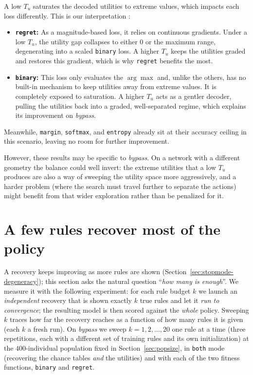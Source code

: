 A low $T_u$ saturates the decoded utilities to extreme values, which impacts each loss differently. This is our interpretation :

\begin{itemize}
    \item \textbf{\texttt{regret}:} As a magnitude-based loss, it relies on continuous gradients. Under a low $T_u$, the utility gap collapses to either $0$ or the maximum range, degenerating into a scaled \texttt{binary} loss. A higher $T_u$ keeps the utilities graded and restores this gradient, which is why \texttt{regret} benefits the most.
    \item \textbf{\texttt{binary}:} This loss only evaluates the $\arg\max$ and, unlike the others, has no built-in mechanism to keep utilities away from extreme values. It is completely exposed to saturation. A higher $T_u$ acts as a gentler decoder, pulling the utilities back into a graded, well-separated regime, which explains its improvement on \emph{bypass}.
\end{itemize}

Meanwhile, \texttt{margin}, \texttt{softmax}, and \texttt{entropy} already sit at their accuracy ceiling in this scenario, leaving no room for further improvement.

However, these results may be specific to \emph{bypass}. On a network with a different geometry the balance could well invert: the extreme utilities that a low $T_u$ produces are
also a way of sweeping the utility space more aggressively, and a harder problem
(where the search must travel further to separate the actions) might benefit
from that wider exploration rather than be penalized for it.
\newpage
\section{A few rules recover most of the policy}
\label{sec:saturation}

A recovery keeps improving as more rules are shown
(Section~\ref{sec:stopmode-degeneracy}); this section asks the natural question
``\emph{how many is enough}''. We measure it with the following experiment: for
each rule budget $k$ we launch an \emph{independent} recovery that is shown
exactly $k$ true rules and let it \emph{run to convergence}; the resulting model is
then scored against the \emph{whole} policy. Sweeping $k$ traces how far the
recovery reaches as a function of how many rules it is given (each $k$ a fresh
run). On \emph{bypass} we sweep $k=1,2,\dots,20$ one rule at a time (three
repetitions, each with a different set of training rules and its own
initialization) at the $400$-individual population fixed in
Section~\ref{sec:popsize}, in \texttt{both} mode (recovering the chance tables
\emph{and} the utilities) and with each of the two
fitness functions, \texttt{binary} and \texttt{regret}. 

